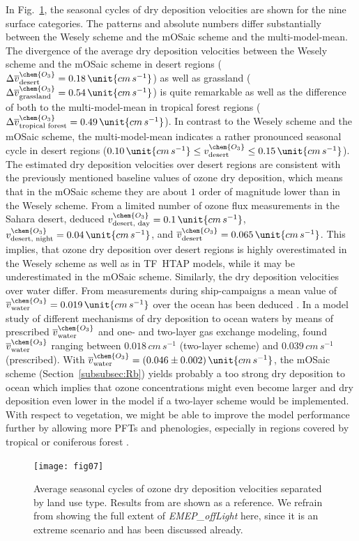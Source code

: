 \documentclass[gmd, manuscript]{copernicus}
\begin{document}
In Fig.~\ref{fig:mmm_drydep_season_pft}, the seasonal cycles of dry deposition velocities are shown for the nine surface categories. The patterns and absolute numbers differ substantially between the Wesely scheme and the mOSaic scheme and the multi-model-mean. The divergence of the average dry deposition velocities between the Wesely scheme and the mOSaic scheme in desert regions ($\Delta \overline{v}_\text{desert}^\chem{O_3} = 0.18\,\unit{cm\,s^{-1}}$) as well as grassland ($\Delta \overline{v}_\text{grassland}^\chem{O_3} = 0.54\,\unit{cm\,s^{-1}}$) is quite remarkable as well as the difference of both to the multi-model-mean in tropical forest regions ($\Delta \overline{v}_\text{tropical forest}^\chem{O_3} = 0.49\,\unit{cm\,s^{-1}}$). In contrast to the Wesely scheme and the mOSaic scheme, the multi-model-mean indicates a rather pronounced seasonal cycle in desert regions ($0.10\,\unit{cm\,s^{-1}} \leq v^\chem{O_3}_\text{desert}\leq 0.15\,\unit{cm\,s^{-1}}$). The estimated dry deposition velocities over desert regions are consistent with the previously mentioned baseline values of ozone dry deposition, which means that in the mOSaic scheme they are about $1$ order of magnitude lower than in the Wesely scheme. From a limited number of ozone flux measurements in the Sahara desert, \citet{AE:Gusten1995} deduced $v^\chem{O_3}_\text{desert, day} = 0.1\,\unit{cm\,s^{-1}}$, $v^\chem{O_3}_\text{desert, night} = 0.04\,\unit{cm\,s^{-1}}$, and $\overline{v}^\chem{O_3}_\text{desert} = 0.065\,\unit{cm\,s^{-1}}$. This implies, that ozone dry deposition over desert regions is highly overestimated in the Wesely scheme as well as in TF~HTAP models, while it may be underestimated in the mOSaic scheme. Similarly, the dry deposition velocities over water differ. From measurements during ship-campaigns a mean value of $\overline{v}^\chem{O_3}_\text{water} = 0.019\,\unit{cm\,s^{-1}}$ over the ocean has been deduced \citep{JGR:Helmig2012}. In a model study of different mechanisms of dry deposition to ocean waters by means of prescribed $\overline{v}_\text{water}^\chem{O_3}$ and one- and two-layer gas exchange modeling, \citet{ACP:Luhar2017} found $\overline{v}_\text{water}^\chem{O_3}$ ranging between $0.018\,\unit{cm\,s^{-1}}$ (two-layer scheme) and $0.039\,\unit{cm\,s^{-1}}$ (prescribed). With $\overline{v}^\chem{O_3}_\text{water} = (0.046\pm0.002)\,\unit{cm\,s^{-1}}$, the mOSaic scheme (Section~\ref{subsubsec:Rb}) yields probably a too strong dry deposition to ocean which implies that ozone concentrations might even become larger and dry deposition even lower in the model if a two-layer scheme would be implemented. With respect to vegetation, we might be able to improve the model performance further by allowing more PFTs and phenologies, especially in regions covered by tropical or coniferous forest \citep{GCB:Anav2017}. 
%
\begin{figure}[t]
  \texttt{[image: fig07]}
  \caption{Average seasonal cycles of ozone dry deposition velocities separated by land use type. Results from \citep{ACP:Hardacre2015} are shown as a reference. We refrain from showing the full extent of \emph{EMEP\_offLight} here, since it is an extreme scenario and has been discussed already.}
  \label{fig:mmm_drydep_season_pft}
\end{figure}
%
\end{document}
